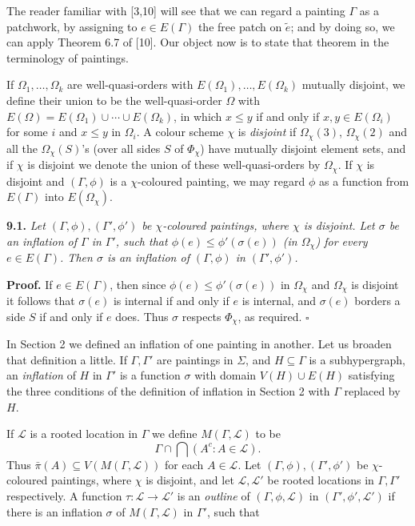 
The reader familiar with [3,10] will see that we can regard a painting $\Gamma$ as a patchwork, by assigning to $e \in E(\Gamma)$ the free patch on $\tilde{e}$; and by doing so, we can apply Theorem 6.7 of [10]. Our object now is to state that theorem in the terminology of paintings.

If $\Omega_1, \ldots, \Omega_k$ are well-quasi-orders with $E(\Omega_1), \ldots, E(\Omega_k)$ mutually disjoint, we define their union to be the well-quasi-order $\Omega$ with $E(\Omega) = E(\Omega_1) \cup \cdots \cup E(\Omega_k)$, in which $x \le y$ if and only if $x, y \in E(\Omega_i)$ for some $i$ and $x \le y$ in $\Omega_i$. A colour scheme $\chi$ is \textit{disjoint} if $\Omega_{\chi}(3)$, $\Omega_{\chi}(2)$ and all the $\Omega_{\chi}(S)$'s (over all sides $S$ of $\Phi_{\chi}$) have mutually disjoint element sets, and if $\chi$ is disjoint we denote the union of these well-quasi-orders by $\Omega_{\chi}$. If $\chi$ is disjoint and $(\Gamma, \phi)$ is a $\chi$-coloured painting, we may regard $\phi$ as a function from $E(\Gamma)$ into $E(\Omega_{\chi})$.

\textbf{9.1.} \textit{Let $(\Gamma, \phi), (\Gamma', \phi')$ be $\chi$-coloured paintings, where $\chi$ is disjoint. Let $\sigma$ be an inflation of $\Gamma$ in $\Gamma'$, such that $\phi(e) \le \phi'(\sigma(e))$ (in $\Omega_{\chi}$) for every $e \in E(\Gamma)$. Then $\sigma$ is an inflation of $(\Gamma, \phi)$ in $(\Gamma', \phi')$.}

\textbf{Proof.} If $e \in E(\Gamma)$, then since $\phi(e) \le \phi'(\sigma(e))$ in $\Omega_{\chi}$ and $\Omega_{\chi}$ is disjoint it follows that $\sigma(e)$ is internal if and only if $e$ is internal, and $\sigma(e)$ borders a side $S$ if and only if $e$ does. Thus $\sigma$ respects $\Phi_{\chi}$, as required. $\square$

In Section 2 we defined an inflation of one painting in another. Let us broaden that definition a little. If $\Gamma, \Gamma'$ are paintings in $\Sigma$, and $H \subseteq \Gamma$ is a subhypergraph, an \textit{inflation} of $H$ in $\Gamma'$ is a function $\sigma$ with domain $V(H) \cup E(H)$ satisfying the three conditions of the definition of inflation in Section 2 with $\Gamma$ replaced by $H$.

If $\mathscr{L}$ is a rooted location in $\Gamma$ we define $M(\Gamma, \mathscr{L})$ to be
\begin{equation*}
\Gamma \cap \bigcap (A^c : A \in \mathscr{L}).
\end{equation*}
Thus $\bar{\pi}(A) \subseteq V(M(\Gamma, \mathscr{L}))$ for each $A \in \mathscr{L}$. Let $(\Gamma, \phi), (\Gamma', \phi')$ be $\chi$-coloured paintings, where $\chi$ is disjoint, and let $\mathscr{L}, \mathscr{L}'$ be rooted locations in $\Gamma, \Gamma'$ respectively. A function $\tau \colon \mathscr{L} \to \mathscr{L}'$ is an \textit{outline} of $(\Gamma, \phi, \mathscr{L})$ in $(\Gamma', \phi', \mathscr{L}')$ if there is an inflation $\sigma$ of $M(\Gamma, \mathscr{L})$ in $\Gamma'$, such that

